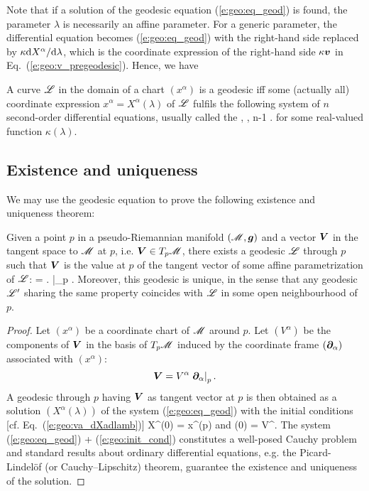 Note that if a solution of the geodesic equation (\ref{e:geo:eq_geod}) is found, the parameter
$\lambda$ is necessarily an affine parameter.
For a generic parameter,
the differential equation becomes (\ref{e:geo:eq_geod}) with the right-hand side
replaced by $\kappa \mathrm{d} X^\alpha /\mathrm{d}\lambda$, which is the coordinate
expression of the right-hand side $\kappa \bm{v}$ in
Eq.~(\ref{e:geo:v_pregeodesic}). Hence, we have
\begin{greybox}
A curve $\mathscr{L}$ in the domain of a chart $(x^\alpha)$ is a geodesic
iff some (actually all) coordinate expression $x^\alpha = X^\alpha(\lambda)$
of $\mathscr{L}$ fulfils the following
system of $n$ second-order differential equations, usually called the
,
\be \label{e:geo:pregeod_eq_comp}
    ,   \leq \alpha \leq n-1 .
\ee
for some real-valued function $\kappa(\lambda)$.
\end{greybox}

\subsection{Existence and uniqueness} \label{s:geo:existence_uniqueness}

We may use the geodesic equation to prove the following existence and uniqueness
theorem:
\begin{greybox}
Given a point $p$ in a pseudo-Riemannian manifold $(\mathscr{M},\bm{g})$ and a vector
$\bm{V}$ in the tangent space to $\mathscr{M}$ at $p$, i.e. $\bm{V} \in T_p\mathscr{M}$,
there exists a geodesic $\mathscr{L}$ through $p$ such that
$\bm{V}$ is the value at $p$ of the tangent vector of some affine parametrization
of $\mathscr{L}$:
\be
     = \left.  \right|_p .
\ee
Moreover, this geodesic is unique, in the sense that any geodesic $\mathscr{L}'$
sharing the same property coincides with $\mathscr{L}$
in some open neighbourhood of $p$.
\end{greybox}
\begin{proof}
Let $(x^\alpha)$ be a coordinate chart of $\mathscr{M}$ around $p$. Let $(V^\alpha)$
be the components of $\bm{V}$ in the basis of $T_p\mathscr{M}$ induced by
the coordinate frame $(\bm{\partial}_\alpha)$ associated with $(x^\alpha)$:
\[
    \bm{V} = V^\alpha \left. \bm{\partial}_\alpha \right| _p .
\]
A geodesic through $p$ having $\bm{V}$ as tangent vector at $p$ is then
obtained as a solution $(X^\alpha(\lambda))$ of the system (\ref{e:geo:eq_geod})
with the initial conditions [cf. Eq.~(\ref{e:geo:va_dXadlamb})]
\be \label{e:geo:init_cond}
    X^\alpha(0) = x^\alpha(p) \quad\mbox{and}\quad
    (0) = V^\alpha .
\ee
The system (\ref{e:geo:eq_geod}) + (\ref{e:geo:init_cond}) constitutes a well-posed
Cauchy problem and standard results about ordinary
differential equations, e.g. the Picard-Lindelöf (or Cauchy–Lipschitz) theorem,
guarantee the existence and uniqueness of the solution.
\end{proof}

